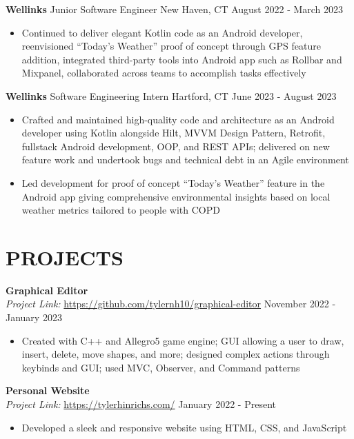 \documentclass[a4paper,10pt]{extarticle}
\begin{document}
\noindent
\textbf{Wellinks} \textbar \space Junior Software Engineer \hfill New Haven, CT \textbar \space August 2022 - March 2023 %
\begin{itemize}
    \item Continued to deliver elegant Kotlin code as an Android developer, reenvisioned “Today’s Weather” proof of concept through GPS feature addition, integrated third-party tools into Android app such as Rollbar and Mixpanel, collaborated across teams to accomplish tasks effectively %
\end{itemize}

\noindent
\textbf{Wellinks} \textbar \space Software Engineering Intern \hfill Hartford, CT \textbar \space June 2023 - August 2023 %
\begin{itemize}
    \item Crafted and maintained high-quality code and architecture as an Android developer using Kotlin alongside Hilt, MVVM Design Pattern, Retrofit, fullstack Android development, OOP, and REST APIs; delivered on new feature work and undertook bugs and technical debt in an Agile environment %
    \item Led development for proof of concept “Today’s Weather” feature in the Android app giving comprehensive environmental insights based on local weather metrics tailored to people with COPD

\end{itemize}

\section*{PROJECTS}
\noindent
\textbf{Graphical Editor}\\ %
\textit{Project Link:} \url{https://github.com/tylernh10/graphical-editor} \hfill November 2022 - January 2023 %
\begin{itemize}[topsep=3pt]
    \item Created with C++ and Allegro5 game engine; GUI allowing a user to draw, insert, delete, move shapes, and more; designed complex actions through keybinds and  GUI; used MVC, Observer, and Command patterns %
\end{itemize}

\noindent
\textbf{Personal Website}\\ %
\textit{Project Link:} \url{https://tylerhinrichs.com/} \hfill January 2022 - Present %
\begin{itemize}[topsep=3pt]
    \item Developed a sleek and responsive website using HTML, CSS, and JavaScript %
\end{itemize}
\end{document}
